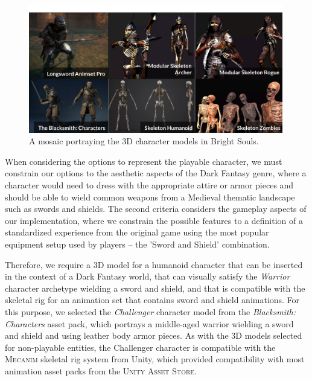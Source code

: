 \begin{figure}
    \caption{A mosaic portraying the 3D character models in Bright Souls.}
    \begin{center}
        \includegraphics[width=30em]{figures/fig-character-assets.png}
    \end{center}
    \label{fig:character-assets}
\end{figure}

When considering the options to represent the playable character, we must constrain our options to the aesthetic aspects of the Dark Fantasy genre, where a character would need to dress with the appropriate attire or armor pieces and should be able to wield common weapons from a Medieval thematic landscape such as swords and shields. The second criteria considers the gameplay aspects of our implementation, where we constrain the possible features to a definition of a standardized experience from the original game using the most popular equipment setup used by players -- the 'Sword and Shield' combination.

Therefore, we require a 3D model for a humanoid character that can be inserted in the context of a Dark Fantasy world, that can visually satisfy the \emph{Warrior} character archetype wielding a sword and shield, and that is compatible with the skeletal rig for an animation set that contains sword and shield animations. For this purpose, we selected the \emph{Challenger} character model from the \emph{Blacksmith: Characters} asset pack, which portrays a middle-aged warrior wielding a sword and shield and using leather body armor pieces. As with the 3D models selected for non-playable entities, the Challenger character is compatible with the \textsc{Mecanim} skeletal rig system from Unity, which provided compatibility with most animation asset packs from the \textsc{Unity Asset Store}.

